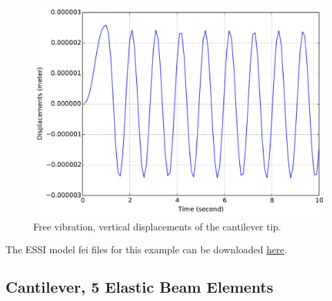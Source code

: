 \documentclass[fleqn,11pt]{article}
\begin{document}
\begin{figure}[!htb]
  \centering
  \includegraphics[width=12cm]{../Figure-files/_Chapter_Appendix_Illustrative_Examples/beam-1element-freeVibration.pdf}
  \caption{Free vibration, vertical displacements of the cantilever tip.}
  \label{fig_beam1_freevib}
\end{figure}


The    ESSI   model   fei   files   for   this   example   can   be   downloaded
\href{https://github.com/BorisJeremic/Real-ESSI-Examples/blob/master/model_fei_file/beam_elastic_1element_dynamic/beam_elastic_1element_dynamic.tgz?raw=true}{here}.























\newpage
\subsection{Cantilever, 5 Elastic Beam Elements} 
\end{document}
